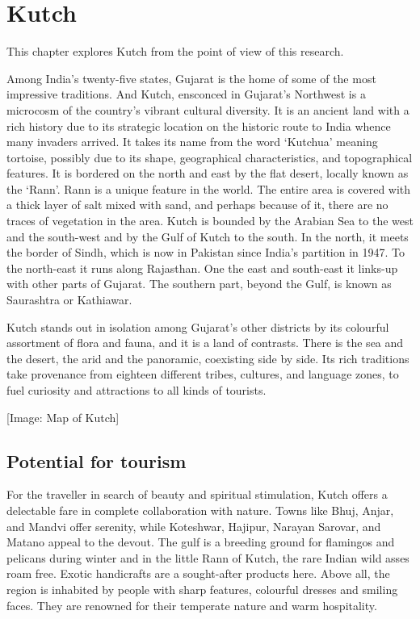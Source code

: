 \chapter{Kutch} %
\label{cha:kutch}

This chapter explores Kutch from the point of view of this research.

Among India's twenty-five states, Gujarat is the home of some of the most impressive traditions. And Kutch, ensconced in Gujarat's Northwest is a microcosm of the country's vibrant cultural diversity. It is an ancient land with a rich history due to its strategic location on the historic route to India whence many invaders arrived. It takes its name from the word `Kutchua' meaning tortoise, possibly due to its shape, geographical characteristics, and topographical features. It is bordered on the north and east by the flat desert, locally known as the `Rann'. Rann is a unique feature in the world. The entire area is covered with a thick layer of salt mixed with sand, and perhaps because of it, there are no traces of vegetation in the area. Kutch is bounded by the Arabian Sea to the west and the south-west and by the Gulf of Kutch to the south. In the north, it meets the border of Sindh, which is now in Pakistan since India's partition in 1947. To the north-east it runs along Rajasthan. One the east and south-east it links-up with other parts of Gujarat. The southern part, beyond the Gulf, is known as Saurashtra or Kathiawar.

Kutch stands out in isolation among Gujarat's other districts by its colourful assortment of flora and fauna, and it is a land of contrasts. There is the sea and the desert, the arid and the panoramic, coexisting side by side. Its rich traditions take provenance from eighteen different tribes, cultures, and language zones, to fuel curiosity and attractions to all kinds of tourists.

[Image: Map of Kutch]

\section{Potential for tourism} %
\label{sec:pot}

For the traveller in search of beauty and spiritual stimulation, Kutch offers a delectable fare in complete collaboration with nature. Towns like Bhuj, Anjar, and Mandvi offer serenity, while Koteshwar, Hajipur, Narayan Sarovar, and Matano appeal to the devout. The gulf is a breeding ground for flamingos and pelicans during winter and in the little Rann of Kutch, the rare Indian wild asses roam free. Exotic handicrafts are a sought-after products here. Above all, the region is inhabited by people with sharp features, colourful dresses and smiling faces. They are renowned for their temperate nature and warm hospitality.

